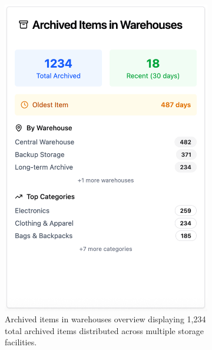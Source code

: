 \begin{figure}[h]
\begin{subfigure}[b]{0.32\textwidth}
        \includegraphics[width=\textwidth]{figs/appendix/web/2B.png}
        \caption{Archived items in warehouses overview displaying 1,234 total archived items distributed across multiple storage facilities.}
        \label{fig:web_archived_items}
    \end{subfigure}
    \hfill
    \begin{subfigure}[b]{0.32\textwidth}
        \centering

\end{subfigure}
\end{figure}
